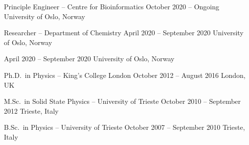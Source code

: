 \documentclass[10pt,a4paper,ragged2e,withhyper]{altacv}
\begin{document}
\begin{paracol}{2}

\cvevent{}
        {Principle Engineer -- Centre for Bioinformatics}
        {October 2020 -- Ongoing}
        {University of Oslo, Norway}

        \cvevent{}
                {Researcher -- Department of Chemistry}
                {April 2020 -- September 2020}
                {University of Oslo, Norway}


                        {April 2020 -- September 2020}
                        {University of Oslo, Norway}


\cvevent{}
        {Ph.D.\ in Physics -- King's College London}
        {October 2012 -- August 2016}
        {London, UK}

\cvevent{}
        {M.Sc.\ in Solid State Physics -- University of Trieste}
        {October 2010 -- September 2012}
        {Trieste, Italy}

\cvevent{}
        {B.Sc.\ in Physics -- University of Trieste}
        {October 2007 -- September 2010}
        {Trieste, Italy}



\end{paracol}
\end{document}
